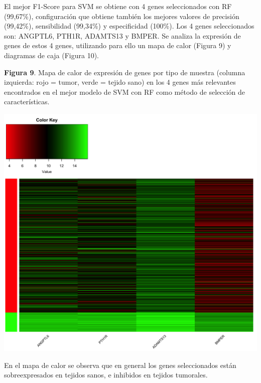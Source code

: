 El mejor F1-Score para SVM se obtiene con 4 genes seleccionados con RF (99,67\%), configuración que obtiene también los mejores valores de precisión (99,42\%), sensibilidad (99,34\%) y especificidad (100\%). Los 4 genes seleccionados son: ANGPTL6, PTH1R, ADAMTS13 y BMPER. Se analiza la expresión de genes de estos 4 genes, utilizando para ello un mapa de calor (Figura 9) y diagramas de caja (Figura 10).

\newpage
\textbf{Figura 9}. Mapa de calor de expresión de genes por tipo de muestra (columna izquierda: rojo = tumor, verde = tejido sano) en los 4 genes más relevantes encontrados en el mejor modelo de SVM con RF como método de selección de características.
\begin{center}
	\includegraphics[width=1\textwidth]{figuras/09_higado_biclase_16_svm_heatmap_mejor_metodo.png} 
\end{center}

En el mapa de calor se observa que en general los genes seleccionados están sobreexpresados en tejidos sanos, e inhibidos en tejidos tumorales.

